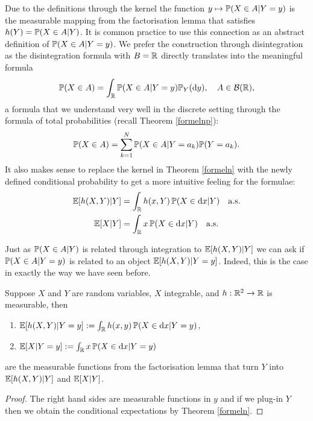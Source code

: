Due to the definitions through the kernel the function $y\mapsto \P(X\in A|Y=y)$ is the measurable mapping from the factorisation lemma that satisfies $h(Y)=\P(X\in A|Y)$. It is common practice to use this connection as an abstract definition of $\P(X\in A|Y=y)$. We prefer the construction through disintegration as the disintegration formula with $B=\R$ directly translates into the meaningful formula
	\begin{align*}
		\P(X\in A)=\int_\R \P(X\in A|Y=y) \P_Y(\mathrm dy),\quad A\in \mathcal B(\R),
	\end{align*}
	a formula that we understand very well in the discrete setting through the formula of total probabilities (recall Theorem \ref{formelnp}):
	\begin{align*}
		\P(X\in A)=\sum_{k=1}^N \P(X\in A|Y=a_k) \P(Y=a_k).
	\end{align*}
It also makes sense to replace the kernel in Theorem \ref{formeln} with the newly defined conditional probability to get a more intuitive feeling for the formulae:
\begin{align*}
	\E[h(X,Y)|Y]&=\int_\R h(x,Y)\, \P(X\in \mathrm dx|Y)\quad \text{a.s.}\\
	\E[X|Y]&=\int_\R x\, \P(X\in \mathrm dx|Y)\quad \text{a.s.}
\end{align*}


Just as $\P(X\in A|Y)$ is related through integration to $\E[h(X,Y)|Y]$ we can ask if $\P(X\in A|Y=y)$ is related to an object $\E[h(X,Y)|Y=y]$.  Indeed, this is the case in exactly the way we have seen before.





\begin{laussagewerkzeug}
\begin{theorem}
	Suppose $X$ and $Y$ are random variables, $X$ integrable, and $h:\R^2\to\R$ is measurable, then
	\begin{enumerate}[label=(\roman*)]
		\item $\E[h(X,Y)|Y=y]:=\int_\R h(x,y) \, \P(X\in \mathrm dx|Y=y)$,
			\item $\E[X|Y=y]:=\int_\R x \, \P(X\in \mathrm dx|Y=y)$
	\end{enumerate}
	are the measurable functions from the factorisation lemma that turn $Y$ into $\E[h(X,Y)|Y]$ and $\E[X|Y]$.
\end{theorem}
\end{laussagewerkzeug}
\begin{proof}[Proof]
	The right hand sides are measurable functions in $y$ and if we plug-in $Y$ then we obtain the conditional expectations by Theorem \ref{formeln}.
\end{proof}



